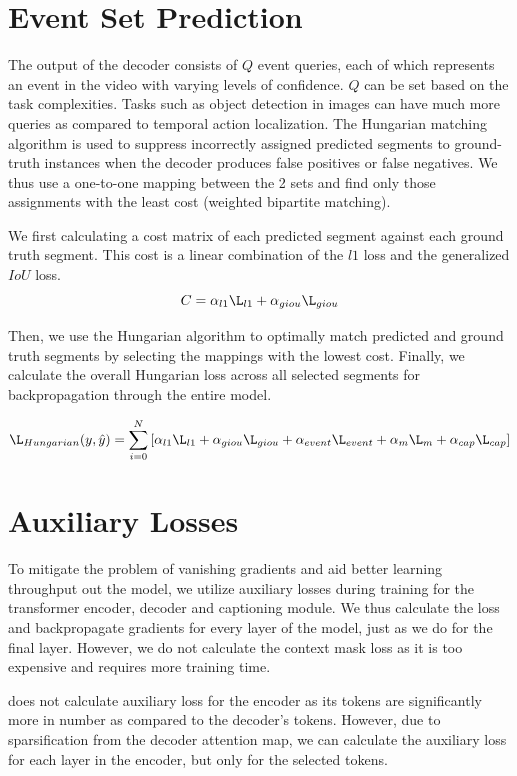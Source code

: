 \section{Event Set Prediction}
\par The output of the decoder consists of $Q$ event queries, each of which represents an event in the video with varying levels of confidence. $Q$ can be set based on the task complexities. Tasks such as object detection in images can have much more queries as compared to temporal action localization. The Hungarian matching algorithm is used to suppress incorrectly assigned predicted segments to ground-truth instances when the decoder produces false positives or false negatives. We thus use a one-to-one mapping between the 2 sets and find only those assignments with the least cost (weighted bipartite matching).
\par We first calculating a cost matrix of each predicted segment against each ground truth segment. This cost is a linear combination of the $l1$ loss and the generalized $IoU$ loss.
$$ C = \alpha_{l1}\L_{l1}  + \alpha_{giou}\L_{giou}$$
\par Then, we use the Hungarian algorithm \cite{hungarian} to optimally match predicted and ground truth segments by selecting the mappings with the lowest cost. Finally, we calculate the overall Hungarian loss across all selected segments for backpropagation through the entire model.

$$\L_{Hungarian}(y, \hat{y}) = \sum_{i=0}^{N}\left [ \alpha_{l1}\L_{l1} + \alpha_{giou}\L_{giou} + \alpha_{event}\L_{event} + \alpha_{m}\L_{m} + \alpha_{cap}\L_{cap} \right ]$$

\section{Auxiliary Losses}
\par To mitigate the problem of vanishing gradients and aid better learning throughput out the model, we utilize auxiliary losses during training for the transformer encoder, decoder and captioning module. We thus calculate the loss and backpropagate gradients for every layer of the model, just as we do for the final layer. However, we do not calculate the context mask loss as it is too expensive and requires more training time.
\par \cite{detr} does not calculate auxiliary loss for the encoder as its tokens are significantly more in number as compared to the decoder's tokens. However, due to sparsification from the decoder attention map, we can calculate the auxiliary loss for each layer in the encoder, but only for the selected tokens. 




